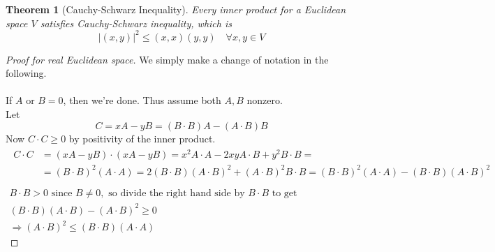 \documentclass[twoside]{amsart}
\theoremstyle{plain}
\newtheorem{theorem}{Theorem}
\theoremstyle{definition}
\begin{document}
\begin{theorem}[Cauchy-Schwarz Inequality]\label{T:Cauchy-Schwarz_Inequality}
  Every inner product for a Euclidean space $V$ satisfies Cauchy-Schwarz inequality, which is 
  \begin{equation}\label{E:Cauchy-Schwarz_Inequality}
    |(x,y)|^2 \leq (x,x)(y,y) \quad \forall x,y \in V
  \end{equation}
\end{theorem}
\begin{proof}[Proof for real Euclidean space]We simply make a change of notation in the following. \\ \\
  If $A$ or $B =0$, then we're done.  Thus assume both $A,B$ nonzero.  \medskip  \\
  Let 
  \begin{equation*}
    C=xA - y B = (B\cdot B)A - (A\cdot B) B
  \end{equation*}
  Now $C\cdot C \geq 0$ by positivity of the inner product.  
  \begin{gather*}
    \begin{aligned}
      C\cdot C & =(xA - y B)\cdot (xA - yB)  = x^2 A\cdot A - 2 xy A\cdot B + y^2 B\cdot B = \\
      & = (B\cdot B)^2 (A\cdot A) = 2(B\cdot B)(A\cdot B)^2 + (A\cdot B)^2 B\cdot B = (B\cdot B)^2 (A\cdot A)- (B\cdot B)(A\cdot B)^2 \\
    \end{aligned} 
    \\
    B\cdot B > 0 \text{ since } B \neq 0, \text{ so divide the right hand side by } B\cdot B \text{ to get } \\
    (B\cdot B)(A \cdot B) - (A \cdot B)^2 \geq 0 \\
    \Longrightarrow (A\cdot B)^2 \leq (B\cdot B)(A\cdot A)
  \end{gather*}
\end{proof}
\end{document}
